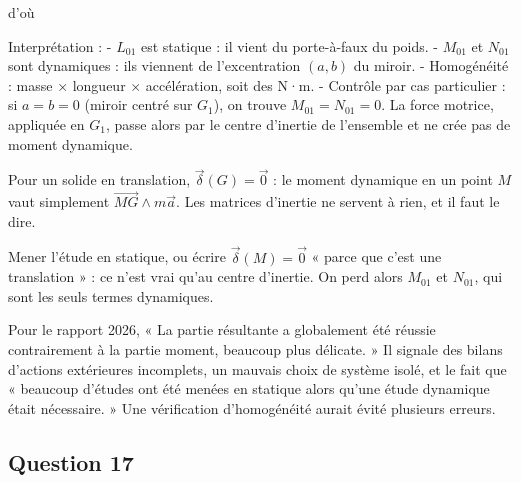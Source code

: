\documentclass[11pt,a4paper]{article}
\newcommand{\equationajustee}[1]{%
  \sbox{\boiteequation}{$\displaystyle #1$}%
  \ifdim\wd\boiteequation>\linewidth
    \[\resizebox{\linewidth}{!}{\usebox{\boiteequation}}\]%
  \else
    \[#1\]%
  \fi}
\begin{document}
d'où

\equationajustee{\boxed{L_{01} = -g\,[(m_1+m_2)l + m_2 b]}}

\equationajustee{\boxed{M_{01} = m_2\,a\,\ddot x}}

\equationajustee{\boxed{N_{01} = m_2\,b\,\ddot x}}

Interprétation :
- \(L_{01}\) est statique : il vient du porte-à-faux du poids.
- \(M_{01}\) et \(N_{01}\) sont dynamiques : ils viennent de l'excentration \((a, b)\) du miroir.
- Homogénéité : masse × longueur × accélération, soit des N·m.
- Contrôle par cas particulier : si \(a = b = 0\) (miroir centré sur \(G_1\)), on trouve \(M_{01} = N_{01} = 0\). La force motrice, appliquée en \(G_1\), passe alors par le centre d'inertie de l'ensemble et ne crée pas de moment dynamique.

\begin{methode}

Pour un solide en translation, \(\vec\delta(G) = \vec 0\) : le moment dynamique en un point \(M\) vaut simplement \(\overrightarrow{MG}\wedge m\vec a\). Les matrices d'inertie ne servent à rien, et il faut le dire.

\end{methode}

\begin{piege}

Mener l'étude en statique, ou écrire \(\vec\delta(M) = \vec 0\) « parce que c'est une translation » : ce n'est vrai qu'au centre d'inertie. On perd alors \(M_{01}\) et \(N_{01}\), qui sont les seuls termes dynamiques.

\end{piege}

\begin{jury}

Pour le rapport 2026, « La partie résultante a globalement été réussie contrairement à la partie moment, beaucoup plus délicate. » Il signale des bilans d'actions extérieures incomplets, un mauvais choix de système isolé, et le fait que « beaucoup d'études ont été menées en statique alors qu'une étude dynamique était nécessaire. » Une vérification d'homogénéité aurait évité plusieurs erreurs.

\end{jury}

\hypertarget{question-17}{%
\subsection{Question 17}\label{question-17}}
\end{document}

